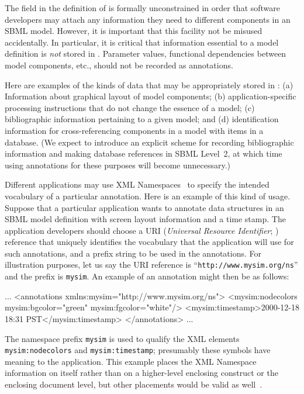 \documentclass[10pt]{cekarticle}
\begin{document}
The  field in the definition of  is
formally unconstrained in order that software developers may attach any
information they need to different components in an SBML model.  However,
it is important that this facility not be misused accidentally.  In
particular, it is critical that information essential to a model definition
is \emph{not} stored in .  Parameter values, functional
dependencies between model components, etc., should not be recorded as
annotations.

Here are examples of the kinds of data that may be appropriately stored in
: (a) Information about graphical layout of model
components; (b) application-specific processing instructions that do not
change the essence of a model; (c) bibliographic information pertaining to
a given model; and (d) identification information for cross-referencing
components in a model with items in a database.  (We expect to introduce an
explicit scheme for recording bibliographic information and making database
references in SBML Level~2, at which time using annotations for these
purposes will become unnecessary.)

Different applications may use XML Namespaces~\citep{bray:1999} to specify
the intended vocabulary of a particular annotation.  Here is an example of
this kind of usage.  Suppose that a particular application wants to
annotate data structures in an SBML model definition with screen layout
information and a time stamp.  The application developers should choose a
URI (\emph{Universal Resource Identifier}; \citealt{harold:2001,w3c:2000})
reference that uniquely identifies the vocabulary that the
application will use for such annotations, and a prefix string to be used
in the annotations.  For illustration purposes, let us say the URI
reference is ``\texttt{http://www.mysim.org/ns}'' and the prefix is
\texttt{mysim}.  An example of an annotation might then be as follows:

\begin{example}
...
<annotations xmlns:mysim="http://www.mysim.org/ns">
    <mysim:nodecolors mysim:bgcolor="green" mysim:fgcolor="white"/>
    <mysim:timestamp>2000-12-18 18:31 PST</mysim:timestamp>
</annotations>
...
\end{example}

The namespace prefix \texttt{mysim} is used to qualify the XML elements
\texttt{mysim:nodecolors} and \texttt{mysim:timestamp}; presumably these
symbols have meaning to the application.  This example places the XML
Namespace information on  itself rather than on a
higher-level enclosing construct or the enclosing document level, but other
placements would be valid as well~\citep{bray:1999}.
\end{document}
